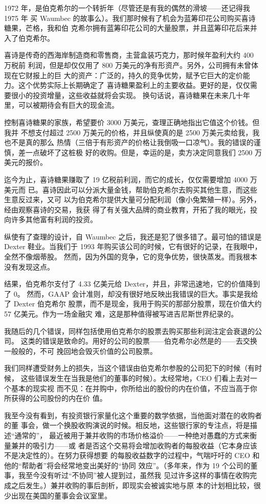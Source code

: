 \documentclass[UTF8,a4paper,zihao=-4,fontset = windows]{ctexart} %
\begin{document}
1972 年，是伯克希尔的一个转折年（尽管还是有我的偶然的滑坡——还记得我 1975 年
买 Waumbec 的故事么）。我们那时候有了机会为蓝筹印花公司购买喜诗糖果，芒格，我和伯
克希尔拥有蓝筹印花公司的大量股票，并且蓝筹印花后来并入了伯克希尔。

喜诗是传奇的西海岸制造商和零售商，主营盒装巧克力，那时候年盈利大约 400 万税前
利润，但是却仅仅用了 800 万美元的净有形资产。另外，公司拥有未曾体现在它财报上的巨
大的资产：广泛的，持久的竞争优势，赋予它巨大的定价能力。这个优势实际上长期确定了
喜诗糖果盈利上的主要收益。更好的是，仅仅需要很小的投资增量，这些收益就将会实现。
换句话说，喜诗糖果在未来几十年里，可以被期待会有巨大的现金流。

控制喜诗糖果的家族，希望要价 3000 万美元，查理正确地指出它值这个价钱。但我并
不想支付超过 2500 万美元的价格，并且纵使真的是 2500 万美元卖给我，我也不是真的那么
热情（三倍于有形资产的价格让我倒吸一口凉气）。我的错误的谨慎，差一点破坏了这桩极
好的收购。但是，幸运的是，卖方决定同意我们 2500 万美元的报价。

迄今为止，喜诗糖果赚取了 19 亿税前利润，而它的成长，仅仅需要增加 4000 万美元而
已。喜诗因此可以分派大量金钱，帮助伯克希尔去购买其他生意，而这些生意反过来，又可
以为伯克希尔提供大量可分配利润（像小兔繁殖一样）。另外，经由观察喜诗的交易，我获
得了有关强大品牌的商业教育，开拓了我的眼光，投向许多其他富有利润的投资。

纵使有了查理的设计，自 Waumbec 之后，我还是犯了很多错了。最可怕的错误是 Dexter
鞋业。当我们于 1993 年购买该公司的时候，它有很好的记录，在我眼中，全然不像烟蒂股。
然而，因为外国的竞争，它的竞争优势，很快蒸发。而我根本没有发现这点。

结果，伯克希尔支付了 4.33 亿美元给 Dexter，并且，非常迅速地，它的价值降到了 0。 然而，GAAP 会计准则，却没有很好地反映出我错误的巨大。事实是我给了 Dexter 伯克希尔
股票，而不是现金，我用于购买的那部分股票，现在价值大约 57 亿美元。作为一场金融灾
难，这是那种值得被写进吉尼斯世界纪录的。

我随后的几个错误，同样包括使用伯克希尔的股票去购买那些利润注定会衰退的公司。
这类的错误是致命的。用好的公司的股票——伯克希尔必然是的——去交换一般般的，不可
挽回地会毁灭价值的公司股票。

我们同样遭受财务上的损失，当这个错误由伯克希尔参股的公司犯下的时候（有时候，
这些错误发生在当我是他们的董事的时候）。太经常地，CEO 们看上去对一个基本的现实视
而不见：在并购中，你所给出的股份的内在价值，不应当高于你所获得的公司股份的内在价
值。

我至今没有看到，有投资银行家量化这个重要的数学依据，当他面对潜在的收购者的董
事会，做一个换股收购演说的时候。相反地，这些银行家的专注点，将是描述“通常的”，
最近被用于兼并收购的市场价格溢价——一种绝对愚蠢的方式来衡量兼并的吸引力——或
者是否这个交易将会增加收购者的每股收益（它本身应该不是决定性的）。在努力获得想要
的每股收益数字的过程中，气喘吁吁的 CEO 和他的“帮助者”将会经常地变出美好的“协同
效应”。（多年来，作为 19 个公司的董事，我至今没有听过“不协同”被人提到过，虽然我
见过许多这样的事情在收购完成之后发生。）兼并收购的事后剖析，即现实会被诚实地与原
本的计划相比较，很少出现在美国的董事会会议室里。
\end{document}
